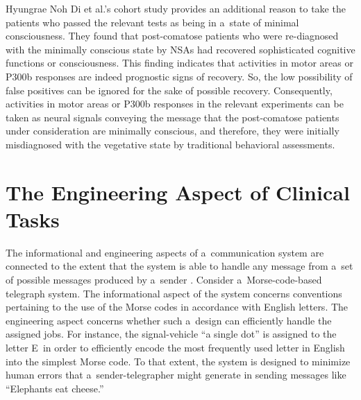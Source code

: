 \begin{artengenv}{Hyungrae Noh}
Di et al.'s
\parencite*[][]{di_neuroimaging_2008} %
 cohort study provides an additional reason to take the patients who passed the relevant tests as being in a~state of minimal consciousness. They found that post-comatose patients who were re-diagnosed with the minimally conscious state by NSAs had recovered sophisticated cognitive functions or consciousness. This finding indicates that activities in motor areas or P300b responses are indeed prognostic signs of recovery. So, the low possibility of false positives can be ignored for the sake of possible recovery. Consequently, activities in motor areas or P300b responses in the relevant experiments can be taken as neural signals conveying the message that the post-comatose patients under consideration are minimally conscious, and therefore, they were initially misdiagnosed with the vegetative state by traditional behavioral assessments.

\section{The Engineering Aspect of Clinical Tasks}
The informational and engineering aspects of a~communication system are connected to the extent that the system is able to handle any message from a~set of possible messages produced by a~sender
\parencite[][p.270]{weaver_recent_1953}. %
 Consider a~Morse-code-based telegraph system. The informational aspect of the system concerns conventions pertaining to the use of the Morse codes in accordance with English letters. The engineering aspect concerns whether such a~design can efficiently handle the assigned jobs. For instance, the signal-vehicle ``a single dot'' is assigned to the letter E~in order to efficiently encode the most frequently used letter in English into the simplest Morse code. To that extent, the system is designed to minimize human errors that a~sender-telegrapher might generate in sending messages like ``Elephants eat cheese.''


\end{artengenv}
